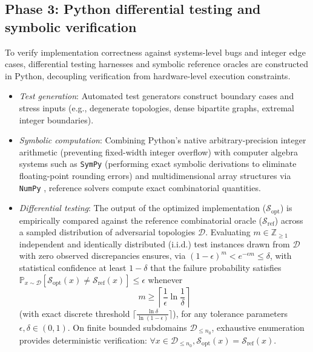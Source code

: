 \documentclass[10pt, letterpaper]{article}
\begin{document}
\subsection{Phase 3: Python differential testing and symbolic verification}\label{sec:phase3_testing}
To verify implementation correctness against systems-level bugs and integer edge cases, differential testing harnesses and symbolic reference oracles are constructed in Python, decoupling verification from hardware-level execution constraints.
\begin{itemize}
    \item \textit{Test generation}: Automated test generators construct boundary cases and stress inputs (e.g., degenerate topologies, dense bipartite graphs, extremal integer boundaries).
    \item \textit{Symbolic computation}: Combining Python's native arbitrary-precision integer arithmetic (preventing fixed-width integer overflow) with computer algebra systems such as \texttt{SymPy} \cite{meurer2017sympy} (performing exact symbolic derivations to eliminate floating-point rounding errors) and multidimensional array structures via \texttt{NumPy} \cite{harris2020array}, reference solvers compute exact combinatorial quantities.
    \item \textit{Differential testing}: The output of the optimized implementation ($\mathcal{S}_{\mathrm{opt}}$) is empirically compared against the reference combinatorial oracle ($\mathcal{S}_{\mathrm{ref}}$) across a sampled distribution of adversarial topologies $\mathcal{D}$. Evaluating $m \in \mathbb{Z}_{\ge 1}$ independent and identically distributed (i.i.d.) test instances drawn from $\mathcal{D}$ with zero observed discrepancies ensures, via $(1 - \epsilon)^m < e^{-\epsilon m} \le \delta$, with statistical confidence at least $1 - \delta$ that the failure probability satisfies $\mathbb{P}_{x \sim \mathcal{D}}[\mathcal{S}_{\mathrm{opt}}(x) \neq \mathcal{S}_{\mathrm{ref}}(x)] \le \epsilon$ whenever
	\begin{equation}\label{eq:sample_complexity}
		m \ge \left\lceil \frac{1}{\epsilon} \ln \frac{1}{\delta} \right\rceil
	\end{equation}
	(with exact discrete threshold $\lceil \frac{\ln \delta}{\ln(1 - \epsilon)} \rceil$), for any tolerance parameters $\epsilon, \delta \in (0, 1)$. On finite bounded subdomains $\mathcal{D}_{\le n_0}$, exhaustive enumeration provides deterministic verification: $\forall x \in \mathcal{D}_{\le n_0}, \mathcal{S}_{\mathrm{opt}}(x) = \mathcal{S}_{\mathrm{ref}}(x)$.
\end{itemize}
\end{document}
